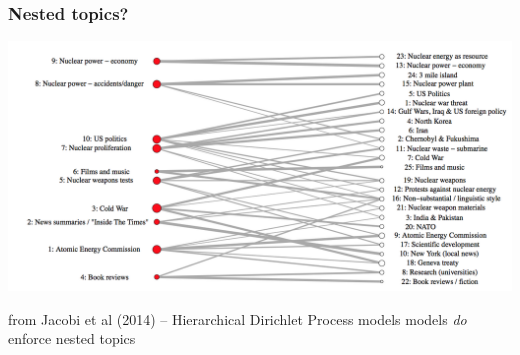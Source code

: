 \documentclass[11pt,compress,professionalfonts]{beamer}
\begin{document}
\begin{frame}[t]\frametitle{Nested topics?}

\centerline{\includegraphics[scale=.8]{pictures/nested-topics-nuclear}}

from Jacobi et al (2014) -- Hierarchical Dirichlet Process models models \textit{do} enforce nested topics

\end{frame}
\end{document}
